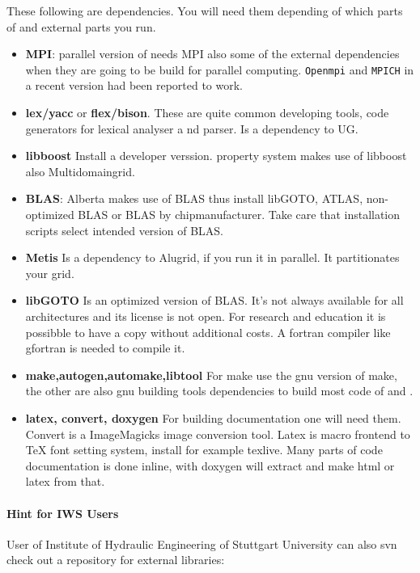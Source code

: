These following are dependencies. You will need them depending of which parts of \Dune and external parts you run.
\begin{itemize}
\item \textbf{MPI}: parallel version of \Dune needs MPI also some of the external dependencies when they are going to be build for parallel computing. \texttt{Openmpi} and \texttt{MPICH} in a recent version had been reported to work. 

\item \textbf{lex/yacc} or \textbf{flex/bison}. These are quite common developing tools, code generators for lexical analyser a nd parser.  Is a dependency to UG.

\item \textbf{libboost} Install a developer verssion. \Dumux property system makes use of libboost also \Dune Multidomaingrid.

\item \textbf{BLAS}: Alberta makes use of BLAS thus install libGOTO, ATLAS, non-optimized BLAS or BLAS by chipmanufacturer. Take care that installation scripts select intended version of BLAS. 

\item \textbf{Metis} Is a dependency to Alugrid, if you run it in parallel. It partitionates your grid.

\item \textbf{libGOTO} Is an optimized version of BLAS. It's not always available for all architectures and 
its license is not open. For research and education it is possibble to have a copy without additional costs.
A fortran compiler like gfortran is needed to compile it.

\item \textbf{make,autogen,automake,libtool} 
For make use the gnu version of make, the other are also gnu building tools dependencies to build most code of \Dune and \Dumux. 

\item \textbf{latex, convert, doxygen} For building \Dumux documentation one will need them. 
Convert is a ImageMagicks image conversion tool. Latex is macro frontend to TeX font setting system, install for example texlive.  Many parts of code documentation is done inline, with doxygen will extract and make html or latex 
from that.
\end{itemize}

\paragraph{Hint for IWS Users} User of Institute of Hydraulic Engineering of Stuttgart University 
can also svn check out a repository for external libraries: 

